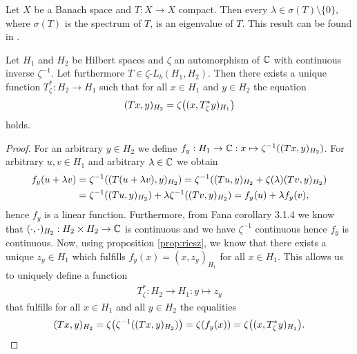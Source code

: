 \begin{remark} \label{remark:compact_spectrum}
	Let $X$ be a Banach space and $T: X \to X$ compact. Then every $\lambda \in \sigma(T) \setminus\{0\}$, where $\sigma(T)$ is the spectrum of $T$, is an eigenvalue of $T$. This result can be found in \cite[p.138]{FAna1}.
\end{remark}

\begin{lemma}
	Let $H_1$ and $H_2$ be Hilbert spaces and $\zeta$ an automorphism of $\mathbb{C}$ with continuous inverse $\zeta^{-1}$. Let furthermore $T \in \zeta\text{-}L_b(H_1, H_2)$. Then there exists a unique function $T_\zeta^\ast: H_2 \to H_1$ such that for all $x \in H_1$ and $y \in H_2$ the equation 
	\begin{align*}
		(Tx, y)_{H_2} = \zeta{\left ( (x, T_\zeta^\ast y)_{H_1} \right )}
	\end{align*}
	holds. 
\end{lemma}

\begin{proof}
	For an arbitrary $y \in H_2$ we define $f_y: H_1 \to \mathbb{C}: x \mapsto \zeta^{-1}{\left ( (Tx,y)_{H_2} \right )}$. For arbitrary $u,v \in H_1$ and arbitrary $\lambda \in \mathbb{C}$ we obtain
	\begin{align*}
		f_y(u + \lambda v) &= \zeta^{-1}{\left ( (T(u + \lambda v), y)_{H_2} \right )} = \zeta^{-1}{\left ( (Tu, y)_{H_2} + \zeta(\lambda) (Tv, y)_{H_2} \right )} \\
		&= \zeta^{-1}{\left ( (Tu,y)_{H_2} \right )} + \lambda \zeta^{-1}{\left ( (Tv,y)_{H_2} \right )} = f_y(u) + \lambda f_y(v),
	\end{align*}
	hence $f_y$ is a linear function. Furthermore, from Fana corollary 3.1.4 we know that $(\cdot, \cdot)_{H_2}: H_2 \times H_2 \to \mathbb{C}$ is continuous and we have $\zeta^{-1}$ continuous hence $f_y$ is continuous. Now, using proposition \ref{prop:riesz}, we know that there exists a unique $z_y \in H_1$ which fulfills $f_y(x) = (x,z_y)_{H_1}$ for all $x \in H_1$. This allows us to uniquely define a function
	\begin{align*}
		T_\zeta^\ast: H_2 \to H_1: y \mapsto z_y
	\end{align*}
	that fulfills for all $x \in H_1$ and all $y \in H_2$ the equalities
	\begin{align*}
		(Tx,y)_{H_2} = \zeta{\left ( \zeta^{-1}{\left ( (Tx,y)_{H_2} \right )} \right )} = \zeta{\left ( f_y(x) \right )} = \zeta {\left ( (x, T_\zeta^\ast y)_{H_1} \right )}.
	\end{align*}
\end{proof}


